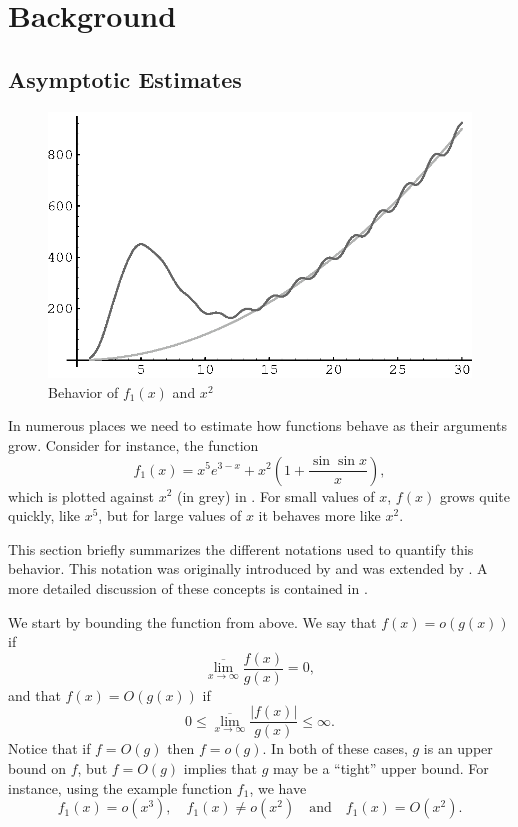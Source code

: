 \chapter{Background}
\label{Background:Chap}

\section{Asymptotic Estimates}
\label{Back:Asymp:Sec}

\begin{figure}
\begin{center}
\includegraphics{Pix/AsympFun.eps}\end{center}
\caption{Behavior of $f_1(x)$ and $x^2$\label{AsympFun:Fig}}
\end{figure}

In numerous places we need to estimate how functions behave as
their arguments grow.  Consider for instance, the function
\[
f_1(x) = x^5 e^{3-x} + x^2 \left(1 + \frac{\sin \sin x}{x}\right),
\]
which is plotted against $x^2$ (in grey) in .
For small values of $x$, $f(x)$ grows quite quickly, like $x^5$, but
for large values of $x$ it behaves more like $x^2$.  

This section briefly summarizes the different notations used to
quantify this behavior.  This notation was originally introduced by
{\LandauE} \cite{Landau:Primzahlen} and was extended by {\Knuth}
\cite{Knuth76b}.  A more detailed discussion of these concepts is
contained in \cite{Cormen91}.

We start by bounding the function from above.  We say that $f(x) =
o(g(x))$ if
\[
\overline{\lim_{x\rightarrow \infty}} \frac{f(x)}{g(x)} = 0,
\]
and that 
$f(x) = O(g(x))$ if 
\[
0 \le \overline{\lim_{x\rightarrow \infty}} \frac{|f(x)|}{g(x)} \le \infty.
\]
Notice that if $f = O(g)$ then $f = o(g)$.  In both of these cases,
$g$ is an upper bound on $f$, but $f=O(g)$ implies that $g$ may be a
``tight'' upper bound.  For instance, using the example function
$f_1$, we have
\[
f_1(x) = o(x^3), \quad f_1(x) \not= o(x^2) \quad\mbox{and}\quad
f_1(x) = O(x^2).
\]


